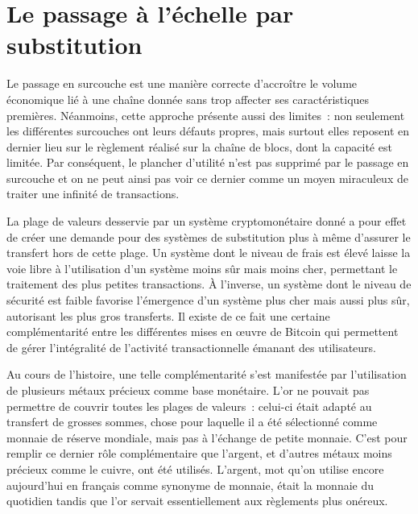
\section*{Le passage à l'échelle par substitution}

Le passage en surcouche est une manière correcte d'accroître le volume économique lié à une chaîne donnée sans trop affecter ses caractéristiques premières. Néanmoins, cette approche présente aussi des limites~: non seulement les différentes surcouches ont leurs défauts propres, mais surtout elles reposent en dernier lieu sur le règlement réalisé sur la chaîne de blocs, dont la capacité est limitée. Par conséquent, le plancher d'utilité n'est pas supprimé par le passage en surcouche et on ne peut ainsi pas voir ce dernier comme un moyen miraculeux de traiter une infinité de transactions.

La plage de valeurs desservie par un système cryptomonétaire donné a pour effet de créer une demande pour des systèmes de substitution plus à même d'assurer le transfert hors de cette plage. Un système dont le niveau de frais est élevé laisse la voie libre à l'utilisation d'un système moins sûr mais moins cher, permettant le traitement des plus petites transactions. À l'inverse, un système dont le niveau de sécurité est faible favorise l'émergence d'un système plus cher mais aussi plus sûr, autorisant les plus gros transferts. Il existe de ce fait une certaine complémentarité entre les différentes mises en œuvre de Bitcoin qui permettent de gérer l'intégralité de l'activité transactionnelle émanant des utilisateurs.

Au cours de l'histoire, une telle complémentarité s'est manifestée par l'utilisation de plusieurs métaux précieux comme base monétaire. L'or ne pouvait pas permettre de couvrir toutes les plages de valeurs~: celui-ci était adapté au transfert de grosses sommes, chose pour laquelle il a été sélectionné comme monnaie de réserve mondiale, mais pas à l'échange de petite monnaie. C'est pour remplir ce dernier rôle complémentaire que l'argent, et d'autres métaux moins précieux comme le cuivre, ont été utilisés. L'argent, mot qu'on utilise encore aujourd'hui en français comme synonyme de monnaie, était la monnaie du quotidien tandis que l'or servait essentiellement aux règlements plus onéreux.

